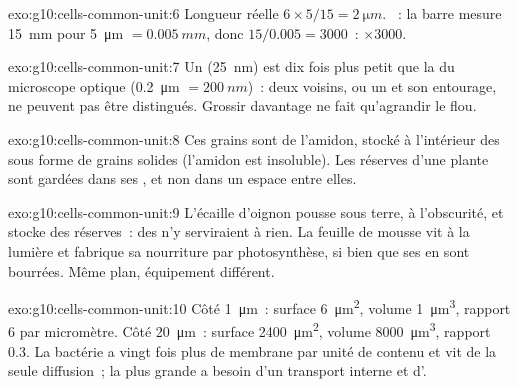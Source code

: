 \begin{solution}{exo:g10:cells-common-unit:6}
Longueur réelle $6 \times 5/15 = \qty{2}{\micro m}$. ~: la
barre mesure \qty{15}{mm} pour \qty{5}{\micro m} $= \qty{0.005}{mm}$,
donc $15/0.005 = 3000$~: $\times 3000$.
\end{solution}

\begin{solution}{exo:g10:cells-common-unit:7}
Un  (\qty{25}{nm}) est dix fois plus petit que la  du
microscope optique (\qty{0.2}{\micro m} $= \qty{200}{nm}$)~: deux
 voisins, ou un  et son entourage, ne peuvent pas être
distingués. Grossir davantage ne fait qu'agrandir le flou.
\end{solution}

\begin{solution}{exo:g10:cells-common-unit:8}
Ces grains sont de l'amidon, stocké à l'intérieur des  sous
forme de grains solides (l'amidon est insoluble). Les réserves d'une
plante sont gardées dans ses , et non dans un espace entre
elles.
\end{solution}

\begin{solution}{exo:g10:cells-common-unit:9}
L'écaille d'oignon pousse sous terre, à l'obscurité, et stocke des
réserves~: des  n'y serviraient à rien. La feuille de
mousse vit à la lumière et fabrique sa nourriture par photosynthèse,
si bien que ses  en sont bourrées. Même plan, équipement
différent.
\end{solution}

\begin{solution}{exo:g10:cells-common-unit:10}
Côté \qty{1}{\micro m}~: surface \qty{6}{\micro m^2}, volume
\qty{1}{\micro m^3}, rapport 6 par micromètre. Côté
\qty{20}{\micro m}~: surface \qty{2400}{\micro m^2}, volume
\qty{8000}{\micro m^3}, rapport 0.3. La bactérie a vingt fois plus de
membrane par unité de contenu et vit de la seule diffusion~; la
 plus grande a besoin d'un transport interne et d'.
\end{solution}

